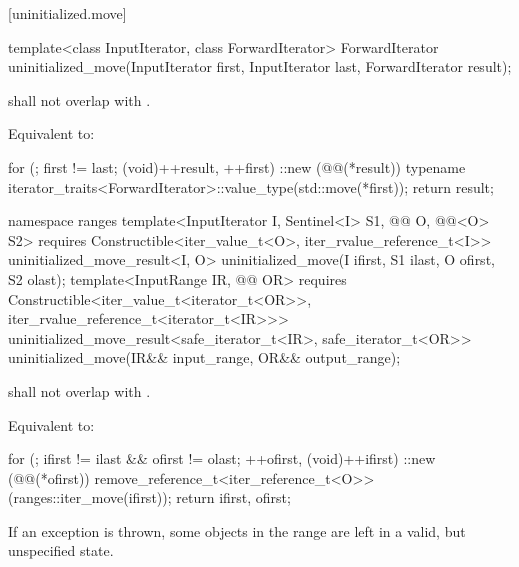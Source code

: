 [uninitialized.move]{}

%
\begin{itemdecl}
template<class InputIterator, class ForwardIterator>
  ForwardIterator uninitialized_move(InputIterator first, InputIterator last,
                                     ForwardIterator result);
\end{itemdecl}

\begin{itemdescr}
\pnum
\expects
{} shall not overlap with .

\pnum
\effects
Equivalent to:
\begin{codeblock}
for (; first != last; (void)++result, ++first)
  ::new (@@(*result))
    typename iterator_traits<ForwardIterator>::value_type(std::move(*first));
return result;
\end{codeblock}
\end{itemdescr}

%
\begin{itemdecl}
namespace ranges {
  template<InputIterator I, Sentinel<I> S1,
           @@ O, @@<O> S2>
      requires Constructible<iter_value_t<O>, iter_rvalue_reference_t<I>>
    uninitialized_move_result<I, O>
      uninitialized_move(I ifirst, S1 ilast, O ofirst, S2 olast);
  template<InputRange IR, @@ OR>
      requires Constructible<iter_value_t<iterator_t<OR>>, iter_rvalue_reference_t<iterator_t<IR>>>
    uninitialized_move_result<safe_iterator_t<IR>, safe_iterator_t<OR>>
      uninitialized_move(IR&& input_range, OR&& output_range);
}
\end{itemdecl}

\begin{itemdescr}
\pnum
\expects
{} shall not overlap with .

\pnum
\effects Equivalent to:
\begin{codeblock}
for (; ifirst != ilast && ofirst != olast; ++ofirst, (void)++ifirst) {
  ::new (@@(*ofirst))
    remove_reference_t<iter_reference_t<O>>(ranges::iter_move(ifirst));
}
return {ifirst, ofirst};
\end{codeblock}

\pnum
\begin{note}
If an exception is thrown, some objects in the range  are
left in a valid, but unspecified state.
\end{note}
\end{itemdescr}

